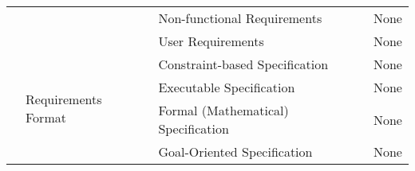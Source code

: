 \begin{table}[]
{\begin{tabular}{clll}
\multicolumn{1}{c|}{}                      &                                                      & Non-functional Requirements             & None                                                                                                                                                                                                                                                                                                                                      \\
\multicolumn{1}{c|}{}                      &                                                      & User Requirements                       & None                                                                                                                                                                                                                                                                                                                                      \\ \cline{2-4} 
\multicolumn{1}{c|}{}                      & \multirow{8}{*}{Requirements Format}                 & Constraint-based Specification          & None                                                                                                                                                                                                                                                                                                                                      \\
\multicolumn{1}{c|}{}                      &                                                      & Executable Specification                & None                                                                                                                                                                                                                                                                                                                                      \\
\multicolumn{1}{c|}{}                      &                                                      & Formal (Mathematical) Specification     & None                                                                                                                                                                                                                                                                                                                                      \\
\multicolumn{1}{c|}{}                      &                                                      & Goal-Oriented Specification             & None                                                                                                                                                                                                                                                                                                                                      \\

\end{tabular}}
\end{table}
